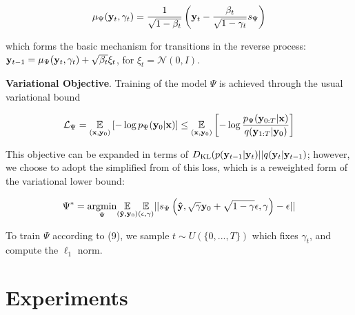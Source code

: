 \documentclass{article}
\begin{document}
\begin{equation}
\mu_{\Psi}(\bold{y}_{t},\gamma_{t}) = \frac{1}{\sqrt{1-\beta_{t}}}\left(\bold{y}_{t} - \frac{\beta_{t}}{\sqrt{1-\gamma_{t}}}s_{\Psi}\right)
\end{equation}

which forms the basic mechanism for transitions in the reverse process: $\bold{y}_{t-1} = \mu_{\Psi}(\bold{y}_{t},\gamma_{t}) + \sqrt{\beta_{t}}\xi_{t}$, for $\xi_{t} = \mathcal{N}(0,I)$.

\textbf{Variational Objective}. Training of the model $\Psi$ is achieved through the usual variational bound

\begin{equation}
\mathcal{L}_{\Psi} = \underset{(\bold{x},\bold{y}_{0})}{\mathbb{E}}\left[-\log p_{\Psi}(\bold{y}_{0}|\bold{x})\right] \leq  \underset{(\bold{x},\bold{y}_{0})}{\mathbb{E}}\left[-\log \frac{p_{\Psi}(\bold{y}_{0:T}|\bold{x})}{q(\bold{y}_{1:T}|\bold{y}_{0})}\right]
\end{equation}

This objective can be expanded in terms of $D_{\mathrm{KL}}(p(\bold{y}_{t-1}|\bold{y}_{t})|| q(\bold{y}_{t}|\bold{y}_{t-1})$; however, we choose to adopt the simplified from of this loss, which is a reweighted form of the variational lower bound: 

\begin{equation}
\Psi^{*} = \underset{\Psi}{\mathrm{argmin}} \underset{(\bold{\hat{y}},\bold{y}_{0})}{\mathbb{E}}\underset{(\epsilon,\gamma)}{\mathbb{E}} \lvert\lvert s_{\Psi}\left(\bold{\hat{y}}, \sqrt{\gamma} \bold{y}_0 + \sqrt{1 - \gamma} \epsilon, \gamma\right) - \epsilon \lvert\lvert
\end{equation}

To train $\Psi$ according to (9), we sample $t\sim U(\{0,...,T\})$ which fixes $\gamma_{t}$, and compute the $\ell_{1}$ norm.

\section{Experiments}
\end{document}
